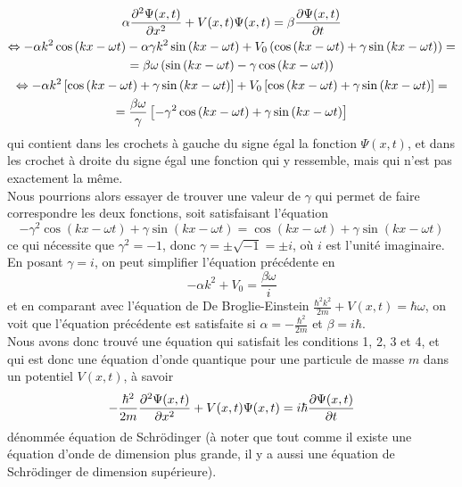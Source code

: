 \begin{gather*}
    \alpha \pdv[2]{\Psi (x,t)}{x} + V(x,t) \Psi (x,t) = \beta \pdv{\Psi (x,t)}{t}\\
    \Leftrightarrow - \alpha k^2 \cos \left( kx - \omega t \right) - \alpha \gamma k^2 \sin \left( kx - \omega t \right) + V_0 \left( \cos \left( kx - \omega t \right) + \gamma \sin \left( kx - \omega t \right) \right) = \\ = \beta \omega \left( \sin \left( kx - \omega t \right) - \gamma \cos \left( kx - \omega t \right) \right)\\
    \Leftrightarrow - \alpha k^2 \left[ \cos \left( kx - \omega t \right) + \gamma \sin \left( kx - \omega t \right) \right] + V_0 \left[ \cos \left( kx - \omega t \right) + \gamma \sin \left( kx - \omega t \right) \right] = \\ = \frac{\beta \omega}{\gamma} \left[- \gamma^2 \cos \left( kx - \omega t \right) + \gamma \sin \left( kx - \omega t \right) \right]\\
\end{gather*}
qui contient dans les crochets à gauche du signe égal la fonction $\Psi (x,t)$, et dans les crochet à droite du signe
égal une fonction qui y ressemble, mais qui n'est pas exactement la même.\\
Nous pourrions alors essayer de trouver une valeur de $\gamma$ qui permet de faire correspondre les deux fonctions,
soit satisfaisant l'équation
\[
- \gamma^2 \cos \left( kx - \omega t \right) + \gamma \sin \left( kx - \omega t \right) = \cos \left( kx - \omega t \right) + \gamma \sin \left( kx - \omega t \right)
\]
ce qui nécessite que $\gamma^2 = -1$, donc $\gamma = \pm \sqrt{-1} = \pm i$, où $i$ est l'unité imaginaire.
En posant $\gamma = i$, on peut simplifier l'équation précédente en
\[
    - \alpha k^2 + V_0 = \frac{\beta \omega}{i}
\]
et en comparant avec l'équation de De Broglie-Einstein $\frac{\hbar^2 k^2}{2m} + V(x,t) = \hbar \omega$,
on voit que l'équation précédente est satisfaite si $\alpha = - \frac{\hbar^2}{2m}$ et $\beta = i \hbar$.\\
Nous avons donc trouvé une équation qui satisfait les conditions 1, 2, 3 et 4, et qui est donc une équation
d'onde quantique pour une particule de masse $m$ dans un potentiel $V(x,t)$, à savoir
\[
    - \frac{\hbar^2}{2m} \pdv[2]{\Psi (x,t)}{x} + V(x,t) \Psi (x,t) = i \hbar \pdv{\Psi (x,t)}{t}
\]
dénommée équation de Schrödinger (à noter que tout comme il existe une équation d'onde de dimension plus grande,
il y a aussi une équation de Schrödinger de dimension supérieure).\\
